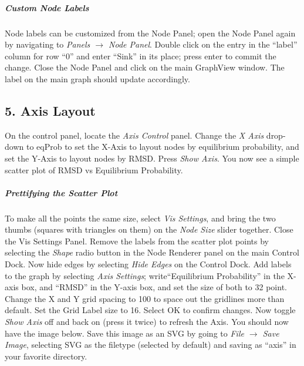 \documentclass[10pt,a4paper]{report}
\begin{document}
\subparagraph*{Custom Node Labels}
Node labels can be customized from the Node Panel; open the Node Panel again by navigating to \emph{Panels $\rightarrow$ Node Panel}. Double click on the entry in the ``label'' column for row ``0'' and enter ``Sink'' in its place; press enter to commit the change. Close the Node Panel and click on the main GraphView window. The label on the main graph should update accordingly. 

\subsection*{5. Axis Layout}
On the control panel, locate the \emph{Axis Control} panel. Change the \emph{X Axis} drop-down to eqProb to set the X-Axis to layout nodes by equilibrium probability, and set the Y-Axis to layout nodes by RMSD. Press \emph{Show Axis}. You now see a simple scatter plot of RMSD vs Equilibrium Probability. 

\subparagraph*{Prettifying the Scatter Plot}
To make all the points the same size, select \emph{Vis Settings}, and bring the two thumbs (squares with triangles on them) on the \emph{Node Size} slider together. Close the Vis Settings Panel. Remove the labels from the scatter plot points by selecting the \emph{Shape} radio button in the Node Renderer panel on the main Control Dock. Now hide edges by selecting \emph{Hide Edges} on the Control Dock. Add labels to the graph by selecting \emph{Axis Settings}; write``Equilibrium Probability'' in the X-axis box, and ``RMSD'' in the Y-axis box, and set the size of both to 32 point. Change the X and Y grid spacing to 100 to space out the gridlines more than default. Set the Grid Label size to 16. Select OK to confirm changes. Now toggle \emph{Show Axis} off and back on (press it twice) to refresh the Axis. You should now have the image below. Save this image as an SVG by going to \emph{File $\rightarrow$ Save Image}, selecting SVG as the filetype (selected by default) and saving as ``axis'' in your favorite directory.
\end{document}
